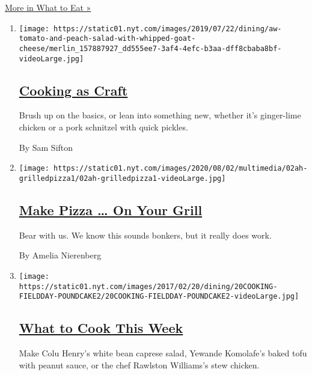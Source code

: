 \href{/spotlight/what-to-eat}{More in What to Eat »}

\begin{enumerate}
\def\labelenumi{\arabic{enumi}.}
\item
  \texttt{[image: https://static01.nyt.com/images/2019/07/22/dining/aw-tomato-and-peach-salad-with-whipped-goat-cheese/merlin\_157887927\_dd555ee7-3af4-4efc-b3aa-dff8cbaba8bf-videoLarge.jpg]}

  \hypertarget{cooking-as-craft}{%
  \subsection{\texorpdfstring{\href{/2020/08/03/dining/cooking-as-craft.html}{Cooking
  as Craft}}{Cooking as Craft}}\label{cooking-as-craft}}

  Brush up on the basics, or lean into something new, whether it's
  ginger-lime chicken or a pork schnitzel with quick pickles.

  By Sam Sifton
\item
  \texttt{[image: https://static01.nyt.com/images/2020/08/02/multimedia/02ah-grilledpizza1/02ah-grilledpizza1-videoLarge.jpg]}

  \hypertarget{make-pizza--on-your-grill}{%
  \subsection{\texorpdfstring{\href{/2020/08/01/at-home/coronavirus-make-pizza-on-a-grill.html}{Make
  Pizza \ldots{} On Your
  Grill}}{Make Pizza \ldots{} On Your Grill}}\label{make-pizza--on-your-grill}}

  Bear with us. We know this sounds bonkers, but it really does work.

  By Amelia Nierenberg
\item
  \texttt{[image: https://static01.nyt.com/images/2017/02/20/dining/20COOKING-FIELDDAY-POUNDCAKE2/20COOKING-FIELDDAY-POUNDCAKE2-videoLarge.jpg]}

  \hypertarget{what-to-cook-this-week}{%
  \subsection{\texorpdfstring{\href{/2020/08/02/dining/what-to-cook-this-week.html}{What
  to Cook This
  Week}}{What to Cook This Week}}\label{what-to-cook-this-week}}

  Make Colu Henry's white bean caprese salad, Yewande Komolafe's baked
  tofu with peanut sauce, or the chef Rawlston Williams's stew chicken.


\end{enumerate}
